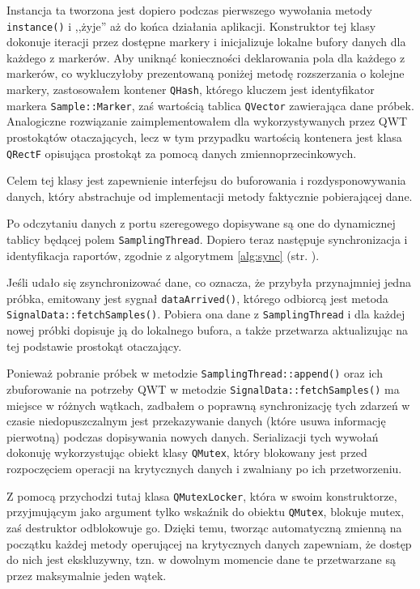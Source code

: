 Instancja ta tworzona jest dopiero podczas pierwszego wywołania metody \verb|instance()| i ,,żyje'' aż do końca działania aplikacji. Konstruktor tej klasy dokonuje iteracji przez dostępne markery i inicjalizuje lokalne bufory danych dla każdego z markerów. Aby uniknąć konieczności deklarowania pola dla każdego z markerów, co wykluczyłoby prezentowaną poniżej metodę rozszerzania o kolejne markery, zastosowałem kontener \verb|QHash|, którego kluczem jest identyfikator markera \verb|Sample::Marker|, zaś wartością tablica \verb|QVector| zawierająca dane próbek. Analogiczne rozwiązanie zaimplementowałem dla wykorzystywanych przez \textsc{QWT} prostokątów otaczających, lecz w tym przypadku wartością kontenera jest klasa \verb|QRectF| opisująca prostokąt za pomocą danych zmiennoprzecinkowych.

Celem tej klasy jest zapewnienie interfejsu do buforowania i rozdysponowywania danych, który abstrachuje od implementacji metody faktycznie pobierającej dane.

Po odczytaniu danych z portu szeregowego dopisywane są one do dynamicznej tablicy będącej polem \verb|SamplingThread|. Dopiero teraz następuje synchronizacja i identyfikacja raportów, zgodnie z algorytmem \ref{alg:sync} (str. \pageref{alg:sync}).

Jeśli udało się zsynchronizować dane, co oznacza, że przybyła przynajmniej jedna próbka, emitowany jest sygnał \verb|dataArrived()|, którego odbiorcą jest metoda \verb|SignalData::fetchSamples()|. Pobiera ona dane z \verb|SamplingThread| i dla każdej nowej próbki dopisuje ją do lokalnego bufora, a także przetwarza aktualizując na tej podstawie prostokąt otaczający.

Ponieważ pobranie próbek w metodzie \verb|SamplingThread::append()| oraz ich zbuforowanie na potrzeby \textsc{QWT} w metodzie \verb|SignalData::fetchSamples()| ma miejsce w różnych wątkach, zadbałem o poprawną synchronizację tych zdarzeń w czasie \ppauza niedopuszczalnym jest przekazywanie danych (które usuwa informację pierwotną) podczas dopisywania nowych danych. Serializacji tych wywołań dokonuję wykorzystując obiekt klasy \verb|QMutex|, który blokowany jest przed rozpoczęciem operacji na krytycznych danych i zwalniany po ich przetworzeniu.

Z pomocą przychodzi tutaj klasa \verb|QMutexLocker|, która w swoim konstruktorze, przyjmującym jako argument tylko wskaźnik do obiektu \verb|QMutex|, blokuje mutex, zaś destruktor odblokowuje go. Dzięki temu, tworząc automatyczną zmienną na początku każdej metody operującej na krytycznych danych zapewniam, że dostęp do nich jest ekskluzywny, tzn. w dowolnym momencie dane te przetwarzane są przez maksymalnie jeden wątek.

